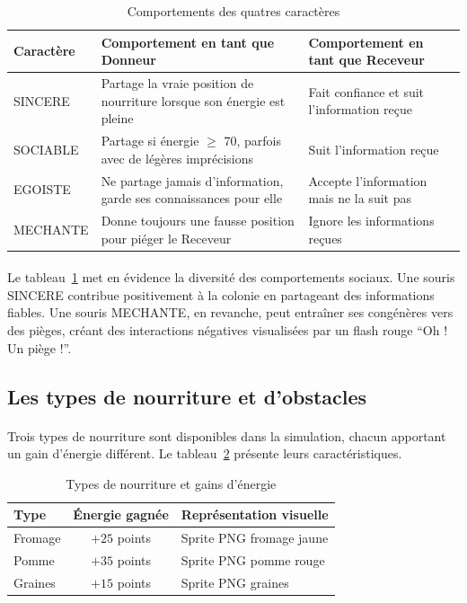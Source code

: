 \begin{table}[h!]
\centering
\renewcommand{\arraystretch}{1.5}
\begin{tabular}{|l|p{4.5cm}|p{4.5cm}|}
\hline
\textbf{Caractère} & \textbf{Comportement en tant que Donneur} & \textbf{Comportement en tant que Receveur} \\
\hline
SINCERE & Partage la vraie position de nourriture lorsque son énergie est pleine & Fait confiance et suit l'information reçue \\
\hline
SOCIABLE & Partage si énergie $\geq$ 70, parfois avec de légères imprécisions & Suit l'information reçue \\
\hline
EGOISTE & Ne partage jamais d'information, garde ses connaissances pour elle & Accepte l'information mais ne la suit pas \\
\hline
MECHANTE & Donne toujours une fausse position pour piéger le Receveur & Ignore les informations reçues \\
\hline
\end{tabular}
\caption{Comportements des quatres caractères}
\label{tab:caracteres}
\end{table}

\paragraph{} Le tableau~\ref{tab:caracteres} met en évidence la diversité des comportements sociaux. Une souris SINCERE contribue positivement à la colonie en partageant des informations fiables. Une souris MECHANTE, en revanche, peut entraîner ses congénères vers des pièges, créant des interactions négatives visualisées par un flash rouge ``Oh ! Un piège !''.

\bigskip

\subsection{Les types de nourriture et d'obstacles}

\paragraph{} Trois types de nourriture sont disponibles dans la simulation, chacun apportant un gain d'énergie différent. Le tableau~\ref{tab:nourriture} présente leurs caractéristiques.

\begin{table}[h!]
\centering
\renewcommand{\arraystretch}{1.4}
\begin{tabular}{|l|c|p{6cm}|}
\hline
\textbf{Type} & \textbf{Énergie gagnée} & \textbf{Représentation visuelle} \\
\hline
Fromage & $+25$ points & Sprite PNG fromage jaune \\
Pomme & $+35$ points & Sprite PNG pomme rouge \\
Graines & $+15$ points & Sprite PNG graines \\
\hline
\end{tabular}
\caption{Types de nourriture et gains d'énergie}
\label{tab:nourriture}
\end{table}

